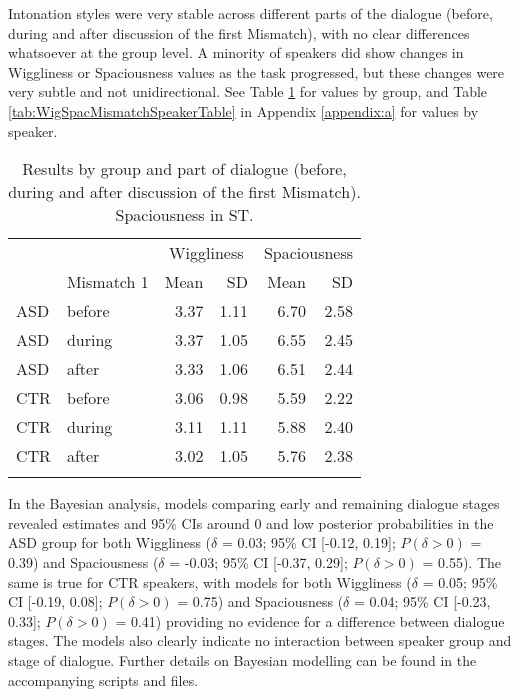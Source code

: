 Intonation styles were very stable across different parts of the dialogue (before, during and after discussion of the first Mismatch), with no clear differences whatsoever at the group level. A minority of speakers did show changes in Wiggliness or Spaciousness values as the task progressed, but these changes were very subtle and not unidirectional. See Table \ref{tab:IntonationGroupTable} for values by group, and Table \ref{tab:WigSpacMismatchSpeakerTable} in Appendix \ref{appendix:a} for values by speaker.



\begin{table}
	
	\begin{center}
			
			\caption{\label{tab:IntonationGroupTable}Results by group and part of dialogue (before, during and after discussion of the first Mismatch). Spaciousness in ST.}
			
			\begin{tabularx}{.8\textwidth}{l@{\qquad}X rr@{\qquad}rr}
				\lsptoprule
				&  & \multicolumn{2}{c}{Wiggliness} & \multicolumn{2}{c}{Spaciousness} \\
				\cmidrule(r){3-4} \cmidrule(r){5-6}
				& Mismatch 1 & Mean & SD & Mean & SD\\
				\midrule
				ASD & before & 3.37 & 1.11 & 6.70 & 2.58\\
				ASD & during & 3.37 & 1.05 & 6.55 & 2.45\\
				ASD & after & 3.33 & 1.06 & 6.51 & 2.44\\
				CTR & before & 3.06 & 0.98 & 5.59 & 2.22\\
				CTR & during & 3.11 & 1.11 & 5.88 & 2.40\\
				CTR & after & 3.02 & 1.05 & 5.76 & 2.38\\
				\lspbottomrule
				\addlinespace
			\end{tabularx}
	\end{center}
	
\end{table}

In the Bayesian analysis, models comparing early and remaining dialogue stages revealed estimates and 95\% CIs around 0 and low posterior probabilities in the ASD group for both Wiggliness (\(\delta\) = 0.03; 95\% CI {[}-0.12, 0.19{]}; \(P(\delta > 0)\) = 0.39) and Spaciousness (\(\delta\) = -0.03; 95\% CI {[}-0.37, 0.29{]}; \(P(\delta > 0)\) = 0.55).
The same is true for CTR speakers, with models for both Wiggliness (\(\delta\) = 0.05; 95\% CI {[}-0.19, 0.08{]}; \(P(\delta > 0)\) = 0.75) and Spaciousness (\(\delta\) = 0.04; 95\% CI {[}-0.23, 0.33{]}; \(P(\delta > 0)\) = 0.41) providing no evidence for a difference between dialogue stages. The models also clearly indicate no interaction between speaker group and stage of dialogue. Further details on Bayesian modelling can be found in the accompanying scripts and files.

